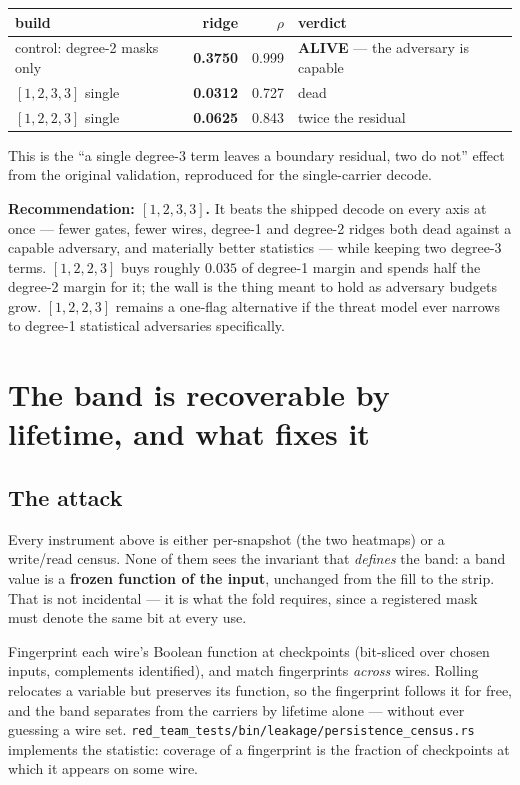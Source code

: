 \documentclass[11pt]{article}
\newcommand{\code}[1]{\texttt{#1}}
\begin{document}
\begin{center}
\begin{tabular}{lrrl}
\toprule
build & ridge & $\rho$ & verdict \\
\midrule
control: degree-2 masks only & \textbf{0.3750} & 0.999 & \textbf{ALIVE} --- the adversary is capable \\
$[1,2,3,3]$ single & \textbf{0.0312} & 0.727 & dead \\
$[1,2,2,3]$ single & \textbf{0.0625} & 0.843 & twice the residual \\
\bottomrule
\end{tabular}
\end{center}

This is the ``a single degree-3 term leaves a boundary residual, two do not''
effect from the original validation, reproduced for the single-carrier decode.

\textbf{Recommendation: $[1,2,3,3]$.} It beats the shipped decode on every axis
at once --- fewer gates, fewer wires, degree-1 and degree-2 ridges both dead
against a capable adversary, and materially better statistics --- while keeping
two degree-3 terms. $[1,2,2,3]$ buys roughly $0.035$ of degree-1 margin and
spends half the degree-2 margin for it; the wall is the thing meant to hold as
adversary budgets grow. $[1,2,2,3]$ remains a one-flag alternative if the
threat model ever narrows to degree-1 statistical adversaries specifically.

\section{The band is recoverable by lifetime, and what fixes it}
\label{sec:persist}

\subsection{The attack}

Every instrument above is either per-snapshot (the two heatmaps) or a
write/read census. None of them sees the invariant that \emph{defines} the
band: a band value is a \textbf{frozen function of the input}, unchanged from
the fill to the strip. That is not incidental --- it is what the fold requires,
since a registered mask must denote the same bit at every use.

Fingerprint each wire's Boolean function at checkpoints (bit-sliced over chosen
inputs, complements identified), and match fingerprints \emph{across} wires.
Rolling relocates a variable but preserves its function, so the fingerprint
follows it for free, and the band separates from the carriers by lifetime
alone --- without ever guessing a wire set. \code{red\_team\_tests/bin/leakage/persistence\_census.rs}
implements the statistic: coverage of a fingerprint is the fraction of
checkpoints at which it appears on some wire.
\end{document}
